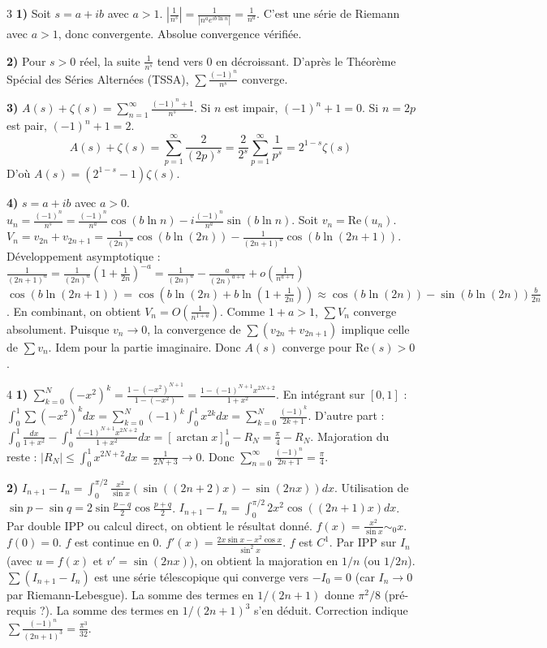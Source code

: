 \begin{correction}{3}
\textbf{1)} Soit $s=a+ib$ avec $a>1$.
$|\frac{1}{n^s}| = \frac{1}{|n^a e^{ib\ln n}|} = \frac{1}{n^a}$.
C'est une série de Riemann avec $a>1$, donc convergente. Absolue convergence vérifiée.

\textbf{2)} Pour $s>0$ réel, la suite $\frac{1}{n^s}$ tend vers 0 en décroissant.
D'après le Théorème Spécial des Séries Alternées (TSSA), $\sum \frac{(-1)^n}{n^s}$ converge.

\textbf{3)} $A(s)+\zeta(s) = \sum_{n=1}^\infty \frac{(-1)^n+1}{n^s}$.
Si $n$ est impair, $(-1)^n+1=0$. Si $n=2p$ est pair, $(-1)^n+1=2$.
$$ A(s)+\zeta(s) = \sum_{p=1}^\infty \frac{2}{(2p)^s} = \frac{2}{2^s} \sum_{p=1}^\infty \frac{1}{p^s} = 2^{1-s} \zeta(s) $$
D'où $A(s) = (2^{1-s}-1)\zeta(s)$.

\textbf{4)} $s=a+ib$ avec $a>0$.
$u_n = \frac{(-1)^n}{n^s} = \frac{(-1)^n}{n^a} \cos(b\ln n) - i \frac{(-1)^n}{n^a} \sin(b\ln n)$.
Soit $v_n = \text{Re}(u_n)$.
$V_n = v_{2n} + v_{2n+1} = \frac{1}{(2n)^a}\cos(b\ln(2n)) - \frac{1}{(2n+1)^a}\cos(b\ln(2n+1))$.
Développement asymptotique :
$\frac{1}{(2n+1)^a} = \frac{1}{(2n)^a}(1+\frac{1}{2n})^{-a} = \frac{1}{(2n)^a} - \frac{a}{(2n)^{a+1}} + o(\frac{1}{n^{a+1}})$
$\cos(b\ln(2n+1)) = \cos(b\ln(2n) + b\ln(1+\frac{1}{2n})) \approx \cos(b\ln(2n)) - \sin(b\ln(2n))\frac{b}{2n}$.
En combinant, on obtient $V_n = O(\frac{1}{n^{1+a}})$.
Comme $1+a > 1$, $\sum V_n$ converge absolument.
Puisque $v_n \to 0$, la convergence de $\sum (v_{2n}+v_{2n+1})$ implique celle de $\sum v_n$.
Idem pour la partie imaginaire. Donc $A(s)$ converge pour $\text{Re}(s)>0$.
\end{correction}

\begin{correction}{4}
\textbf{1)}
$\sum_{k=0}^N (-x^2)^k = \frac{1-(-x^2)^{N+1}}{1-(-x^2)} = \frac{1-(-1)^{N+1}x^{2N+2}}{1+x^2}$.
En intégrant sur $[0,1]$ :
$\int_0^1 \sum (-x^2)^k dx = \sum_{k=0}^N (-1)^k \int_0^1 x^{2k} dx = \sum_{k=0}^N \frac{(-1)^k}{2k+1}$.
D'autre part : $\int_0^1 \frac{dx}{1+x^2} - \int_0^1 \frac{(-1)^{N+1}x^{2N+2}}{1+x^2} dx = [\arctan x]_0^1 - R_N = \frac{\pi}{4} - R_N$.
Majoration du reste : $|R_N| \le \int_0^1 x^{2N+2} dx = \frac{1}{2N+3} \to 0$.
Donc $\sum_{n=0}^\infty \frac{(-1)^n}{2n+1} = \frac{\pi}{4}$.

\textbf{2)}
$I_{n+1}-I_n = \int_0^{\pi/2} \frac{x^2}{\sin x} (\sin((2n+2)x) - \sin(2nx)) dx$.
Utilisation de $\sin p - \sin q = 2 \sin\frac{p-q}{2} \cos\frac{p+q}{2}$.
$I_{n+1}-I_n = \int_0^{\pi/2} 2x^2 \cos((2n+1)x) dx$.
Par double IPP ou calcul direct, on obtient le résultat donné.
$f(x) = \frac{x^2}{\sin x} \sim_0 x$. $f(0)=0$. $f$ est continue en 0.
$f'(x) = \frac{2x\sin x - x^2\cos x}{\sin^2 x}$. $f$ est $C^1$.
Par IPP sur $I_n$ (avec $u=f(x)$ et $v'=\sin(2nx)$), on obtient la majoration en $1/n$ (ou $1/2n$).
$\sum (I_{n+1}-I_n)$ est une série télescopique qui converge vers $-I_0 = 0$ (car $I_n \to 0$ par Riemann-Lebesgue).
La somme des termes en $1/(2n+1)$ donne $\pi^2/8$ (pré-requis ?). La somme des termes en $1/(2n+1)^3$ s'en déduit.
Correction indique $\sum \frac{(-1)^n}{(2n+1)^3} = \frac{\pi^3}{32}$.
\end{correction}

